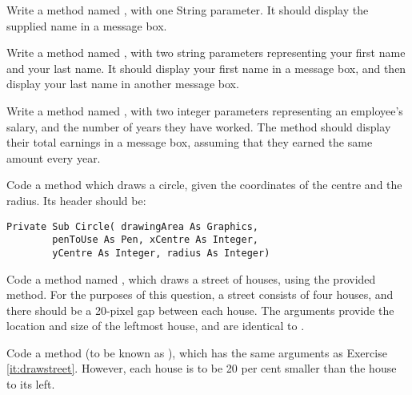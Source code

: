 		\begin{EXE}
			\item Write a method named , with one String parameter. It should display the supplied name in a message box.
			\item Write a method named , with two string parameters representing your first name and your last name. It should display your first name in a message box, and then display your last name in another message box.
			\item Write a method named , with two integer parameters representing an employee's salary, and the number of years they have worked. 
The method should display their total earnings in a message box, assuming that 
they earned the same amount every year.
			\item Code a method which draws a circle, given the coordinates of the centre and the radius. Its header should be:
				\begin{lstlisting}
Private Sub Circle(	drawingArea As Graphics,
		penToUse As Pen, xCentre As Integer,
		yCentre As Integer, radius As Integer)
				\end{lstlisting}
			\item \label{it:drawstreet} Code a method named , which draws a street of houses, using the provided  method. For the purposes of this question, a street consists of four houses, and there should be a 20-pixel gap between each house. The arguments provide the location and size of the leftmost house, and are identical to .
			\item Code a method (to be known as ), which has the same arguments as Exercise \ref{it:drawstreet}. However, each house is to be 20 per cent smaller than the house to its left.
		\end{EXE}

